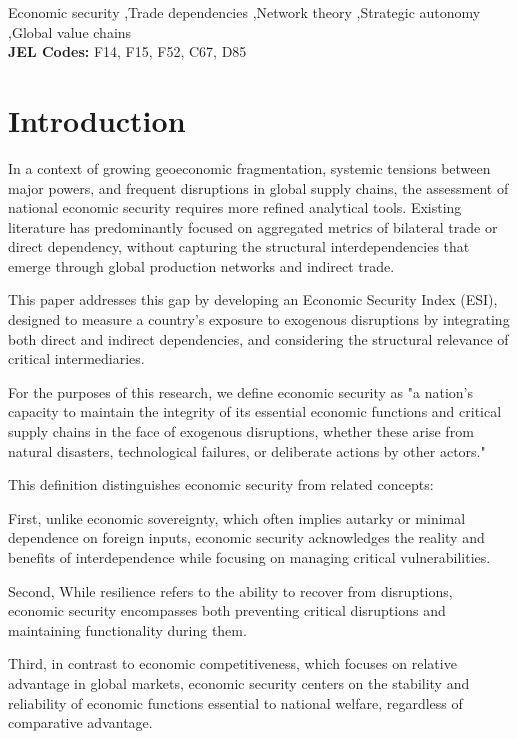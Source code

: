 \documentclass[final,1p,times,authoryear]{elsarticle}
\begin{document}
\begin{frontmatter}
\begin{abstract}
\end{abstract}
\begin{keyword}
Economic security \sep Trade dependencies \sep Network theory \sep Strategic autonomy \sep Global value chains\\
\textbf{JEL Codes:} F14, F15, F52, C67, D85
\end{keyword}
\end{frontmatter}

\section{Introduction}

In a context of growing geoeconomic fragmentation, systemic tensions between major powers, and frequent disruptions in global supply chains, the assessment of national economic security requires more refined analytical tools. Existing literature has predominantly focused on aggregated metrics of bilateral trade or direct dependency, without capturing the structural interdependencies that emerge through global production networks and indirect trade.

This paper addresses this gap by developing an Economic Security Index (ESI), designed to measure a country’s exposure to exogenous disruptions by integrating both direct and indirect dependencies, and considering the structural relevance of critical intermediaries.

For the purposes of this research, we define economic security as "a nation's capacity to maintain the integrity of its essential economic functions and critical supply chains in the face of exogenous disruptions, whether these arise from natural disasters, technological failures, or deliberate actions by other actors."

This definition distinguishes economic security from related concepts:

First, unlike economic sovereignty, which often implies autarky or minimal dependence on foreign inputs, economic security acknowledges the reality and benefits of interdependence while focusing on managing critical vulnerabilities.

Second, While resilience refers to the ability to recover from disruptions, economic security encompasses both preventing critical disruptions and maintaining functionality during them.

Third, in contrast to economic competitiveness, which focuses on relative advantage in global markets, economic security centers on the stability and reliability of economic functions essential to national welfare, regardless of comparative advantage.
\end{document}
